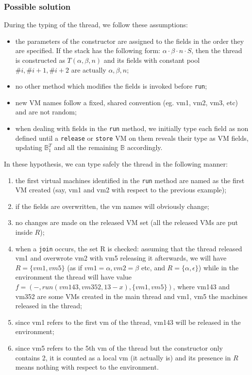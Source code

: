 \documentclass{amsart}
\newcommand{\bB}[1]{\mathbb{B}_{#1}}
\newcommand{\wrt}{with respect to}
\numberwithin{equation}{section}
\theoremstyle{plain} %
\theoremstyle{definition}
\theoremstyle{remark}
\begin{document}
\subsubsection{Possible solution}
During the typing of the thread, we follow these assumptions:
\begin{itemize}
\item the parameters of the constructor are assigned to the fields in the order they are specified. If the stack has the following form: $\alpha\cdot\beta\cdot n\cdot S$, then the thread is constructed as $T(\alpha, \beta, n)$ and its fields with constant pool $\#i, \#i+1, \#i+2$ are actually $\alpha, \beta, n$;
\item no other method which modifies the fields is invoked before \texttt{run};
\item new VM names follow a fixed, shared convention (eg. vm1, vm2, vm3, etc) and are not random;
\item when dealing with fields in the \texttt{run} method, we initially type each field as non defined until a \texttt{release} or \texttt{store} VM on them reveals their type as VM fields, updating $\bB{1}^T$ and all the remaining $\bB{}$ accordingly.
\end{itemize}

In these hypothesis, we can type safely the thread in the following manner:
\begin{enumerate}
\item the first virtual machines identified in the \texttt{run} method are named as the first VM created (say, vm1 and vm2 \wrt{} the previous example);
\item if the fields are overwritten, the vm names will obviously change;
\item no changes are made on the released VM set (all the released VMs are put inside $R$);
\item when a \texttt{join} occurs, the set R is checked: assuming that the thread released vm1 and overwrote vm2 with vm5 releasing it afterwards, we will have $R = \{vm1, vm5\}$ (as if $vm1 = \alpha, vm2 = \beta$ etc, and $R = \{\alpha, \epsilon\}$) while in the environment the thread will have value $f = (-, run(vm143, vm352, 13-x), \{vm1, vm5\})$, where vm143 and vm352 are some VMs created in the main thread and vm1, vm5 the machines released in the thread;
\item since vm1 refers to the first vm of the thread, vm143 will be released in the environment;
\item since vm5 refers to the 5th vm of the thread but the constructor only contains 2, it is counted as a local vm (it actually is) and its presence in $R$ means nothing \wrt{} the environment.
\end{enumerate}
\end{document}
